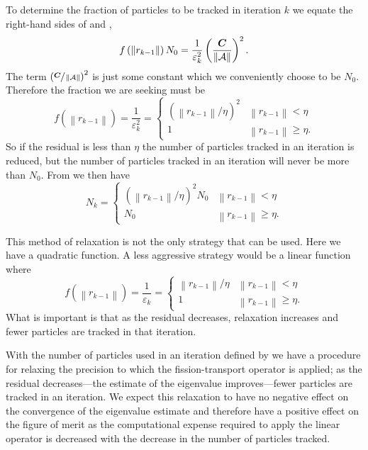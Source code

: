 To determine the fraction of particles to be tracked in iteration $k$ we equate the right-hand sides of  and , 
\begin{equation}
    f\left(\left\|r_{k-1}\right\|\right) N_0 = \frac{1}{\varepsilon_k^2} \left(\frac{\bm{C}}{\left\|\mathcal{A}\right\|}\right)^2 .
\end{equation}
The term $\left(\sfrac{\bm{C}}{\left\|\mathcal{A}\right\|}\right)^2$ is just some constant which we conveniently choose to be $N_0$.  Therefore the fraction we are seeking must be
\begin{equation}
    f\left(\left\|r_{k-1}\right\|\right) = \frac{1}{\varepsilon_k^2} = 
    \begin{cases}
        \left(\left\|r_{k-1}\right\|/\eta\right)^2 & \left\|r_{k-1}\right\| < \eta \\
        1 & \left\|r_{k-1}\right\| \geq \eta.
    \end{cases}
    \label{eq:NFraction}
\end{equation}
So if the residual is less than $\eta$ the number of particles tracked in an iteration is reduced, but the number of particles tracked in an iteration will never be more than $N_0$.  From  we then have
\begin{equation}
    N_k = 
    \begin{cases}
        \left(\left\|r_{k-1}\right\|/\eta\right)^2N_0 & \left\|r_{k-1}\right\| < \eta \\
        N_0 & \left\|r_{k-1}\right\| \geq \eta.
    \end{cases}
    \label{eq:NkFinal}
\end{equation}

This method of relaxation is not the only strategy that can be used.  Here we have a quadratic function.  A less aggressive strategy would be a linear function where
\begin{equation}
    f\left(\left\|r_{k-1}\right\|\right) = \frac{1}{\varepsilon_k} = 
    \begin{cases}
        \left\|r_{k-1}\right\|/\eta & \left\|r_{k-1}\right\| < \eta \\
        1 & \left\|r_{k-1}\right\| \geq \eta.
    \end{cases}
    \label{eq:NkFinalLessAggressive}
\end{equation}
What is important is that as the residual decreases, relaxation increases and fewer particles are tracked in that iteration.  

With the number of particles used in an iteration defined by  we have a procedure for relaxing the precision to which the fission-transport operator is applied; as the residual decreases---the estimate of the eigenvalue improves---fewer particles are tracked in an iteration.  We expect this relaxation to have no negative effect on the convergence of the eigenvalue estimate and therefore have a positive effect on the figure of merit as the computational expense required to apply the linear operator is decreased with the decrease in the number of particles tracked.

